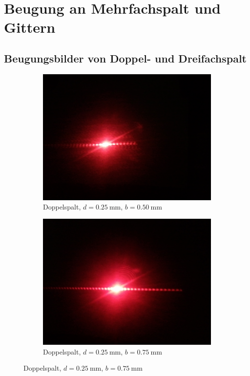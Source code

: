 \documentclass[ngerman, parskip*]{scrartcl}
\begin{document}


\section{Beugung an Mehrfachspalt und Gittern}

\subsection{Beugungsbilder von Doppel- und Dreifachspalt}

\begin{figure}
\centering
        \begin{subfigure}[!h]{0.49\textwidth}
          \centering
          \includegraphics[width=\textwidth,natwidth=2560,natheight=1920]{Bilder/Doppelspalt_1.jpg}
          \caption{Doppelspalt, $d = \SI{0,25}{\mm}$, $b = \SI{0,50}{\mm}$}
        \end{subfigure}
        \begin{subfigure}[!h]{0.49\textwidth}
          \centering
          \includegraphics[width=\textwidth,natwidth=2560,natheight=1920]{Bilder/Doppelspalt_2.jpg}
          \caption{Doppelspalt, $d = \SI{0,25}{\mm}$, $b = \SI{0,75}{\mm}$}
        \end{subfigure}
\end{figure}
\end{document}

